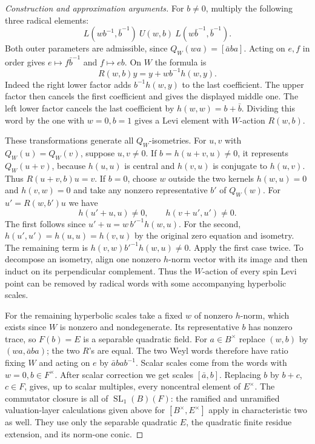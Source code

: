 \documentclass[11pt,a4paper,openany,oneside]{book}
\theoremstyle{resultstyle}
\theoremstyle{definition}
\numberwithin{equation}{chapter}
\begin{document}
\begin{proof}[Construction and approximation arguments]
For \(b\ne0\), multiply the following three radical elements:
\[
 L(wb^{-1},\bar b^{-1})\ U(w,b)\
 L(w\bar b^{-1},\bar b^{-1}).
\]
Both outer parameters are admissible, since
\(Q_W(wa)=[\bar a b a]\). Acting on \(e,f\) in order gives
\(e\mapsto f\bar b^{-1}\) and \(f\mapsto eb\).
On \(W\) the formula is
\[
 R(w,b)y=y+w b^{-1}h(w,y).
\]
Indeed the right lower factor adds
\(b^{-1}h(w,y)\) to the last coefficient. The upper factor
then cancels the first coefficient and gives the displayed
middle one. The left lower factor cancels the last coefficient
by \(h(w,w)=b+\bar b\).
Dividing this word by the one with \(w=0,b=1\) gives a Levi
element with \(W\)-action \(R(w,b)\).

These transformations generate all \(Q_W\)-isometries.
For \(u,v\) with \(Q_W(u)=Q_W(v)\), suppose \(u,v\ne0\).
If \(b=h(u+v,u)\ne0\), it represents \(Q_W(u+v)\), because
\(h(u,u)\) is central and \(h(v,u)\) is conjugate to \(h(u,v)\).
Thus \(R(u+v,b)u=v\). If \(b=0\), choose \(w\) outside the
two kernels \(h(w,u)=0\) and \(h(v,w)=0\) and take any nonzero
representative \(b'\) of \(Q_W(w)\). For \(u'=R(w,b')u\) we have
\[
 h(u'+u,u)\ne0,\qquad h(v+u',u')\ne0.
\]
The first follows since \(u'+u=w\,b'^{-1}h(w,u)\).
For the second, \(h(u',u')=h(u,u)=h(v,u)\) by the original
zero equation and isometry. The remaining term is
\(h(v,w)b'^{-1}h(w,u)\ne0\).
Apply the first case twice. To decompose an isometry, align
one nonzero \(h\)-norm vector with its image and then induct
on its perpendicular complement. Thus the \(W\)-action of every
spin Levi point can be removed by radical words with some
accompanying hyperbolic scales.

For the remaining hyperbolic scales take a fixed \(w\) of
nonzero \(h\)-norm, which exists since \(W\) is nonzero and
nondegenerate. Its representative \(b\) has nonzero trace, so
\(F(b)=E\) is a separable quadratic field. For \(a\in B^\times\)
replace \((w,b)\) by \((wa,\bar a b a)\); the two \(R\)'s are
equal. The two Weyl words therefore have ratio fixing \(W\)
and acting on \(e\) by \(\bar a b a b^{-1}\).
Scalar scales come from the words with \(w=0,b\in F^\times\).
After scalar correction we get scales \([\bar a,b]\).
Replacing \(b\) by \(b+c\), \(c\in F\), gives, up to scalar
multiples, every noncentral element of \(E^\times\). The
commutator closure is all of \(\operatorname{SL}_1(B)(F)\):
the ramified and unramified valuation-layer calculations given
above for \([B^\times,E^\times]\) apply in characteristic two
as well. They use only the separable quadratic \(E\), the
quadratic finite residue extension, and its norm-one conic.


\end{proof}
\end{document}
